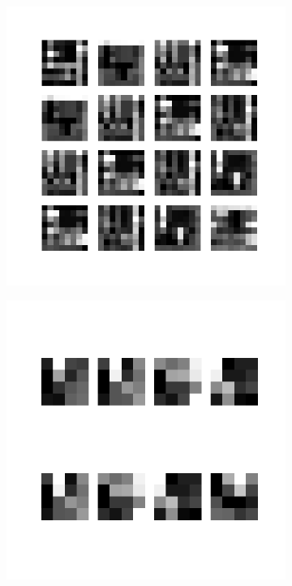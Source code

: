 \begin{figure}
\begin{subfigure}[b]{0.40\linewidth}
    \end{subfigure}
    \\[-0.5cm]
    \begin{subfigure}[b]{0.40\linewidth}
        \includegraphics[width=\linewidth]{images/cae_online_lstm/caelstm_section_cae_training_house_10000_model_feature_maps_map_0_0_1.png}
    \end{subfigure}
    \hfill
    \begin{subfigure}[b]{0.40\linewidth}
        \includegraphics[width=\linewidth]{images/cae_online_lstm/caelstm_section_cae_training_house_10000_model_feature_maps_map_0_0_0.png}

\end{subfigure}
\end{figure}
